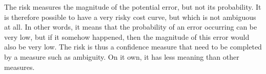 \begin{remark}
     The risk measures the magnitude of the potential error, but not its probability. It is therefore possible to have a very risky cost curve, but which is not ambiguous at all. In other words, it means that the probability of an error occurring can be very low, but if it somehow happened, then the magnitude of this error would also be very low. The risk is thus a confidence measure that need to be completed by a measure such as ambiguity. On it own, it has less meaning than other measures.
     

\end{remark}


